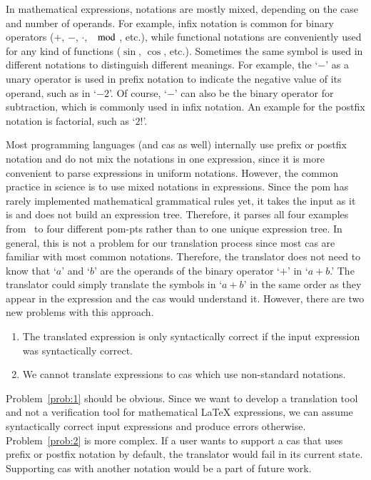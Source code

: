 \documentclass[a4paper,11pt]{article}
\theoremstyle{defTheoStyle}
\theoremstyle{defExampStyle}
\begin{document}
In mathematical expressions, notations are mostly mixed, depending on the case and number of operands. For example, infix notation is common for binary operators ($+$, $-$, $\cdot$, $\mod$, etc.), while functional notations are conveniently used for any kind of functions ($\sin$, $\cos$, etc.). Sometimes the same symbol is used in different notations to distinguish different meanings. For example, the `$-$' as a unary operator is used in prefix notation to indicate the negative value of its operand, such as in `$-2$'. Of course, `$-$' can also be the binary operator for subtraction, which is commonly used in infix notation. An example for the postfix notation is factorial, such as `$2!$'.

Most programming languages (and \gls*{cas} as well) internally use prefix or postfix notation and do not mix the notations in one expression, since it is more convenient to parse expressions in uniform notations. However, the common practice in science is to use mixed notations in expressions. Since the \gls*{pom} has rarely implemented mathematical grammatical rules yet, it takes the input as it is and does not build an expression tree. Therefore, it parses all four examples from~ to four different \gls*{pom-pt}s rather than to one unique expression tree. In general, this is not a problem for our translation process since most \gls*{cas} are familiar with most common notations. Therefore, the translator does not need to know that `$a$' and `$b$' are the operands of the binary operator `$+$' in `$a+b$.' The translator could simply translate the symbols in `$a+b$' in the same order as they appear in the expression and the \gls*{cas} would understand it. However, there are two new problems with this approach.
\begin{enumerate}\item \label{prob:1} The translated expression is only syntactically correct if the input expression was syntactically correct.
\item \label{prob:2} We cannot translate expressions to \gls*{cas} which use non-standard notations.
\end{enumerate}

Problem~\ref{prob:1} should be obvious. Since we want to develop a translation tool and not a verification tool for mathematical \LaTeX{} expressions, we can assume syntactically correct input expressions and produce errors otherwise. Problem~\ref{prob:2} is more complex. If a user wants to support a \gls*{cas} that uses prefix or postfix notation by default, the translator would fail in its current state. Supporting \gls*{cas} with another notation would be a part of future work.
\end{document}

